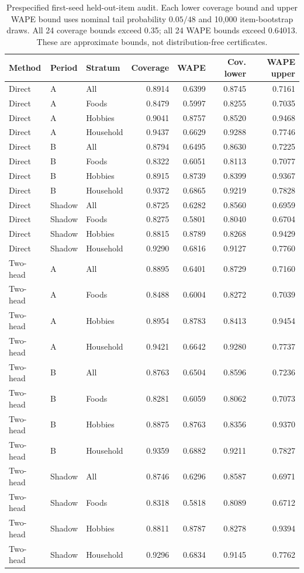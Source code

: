 \begin{table}[p]
\centering\small
\caption{Prespecified first-seed held-out-item audit. Each lower coverage bound and upper WAPE bound uses nominal tail probability $0.05/48$ and 10,000 item-bootstrap draws. All 24 coverage bounds exceed 0.35; all 24 WAPE bounds exceed 0.64013. These are approximate bounds, not distribution-free certificates.}
\label{tab:m5guardianbounds}
\begin{tabular}{lllrrrr}\toprule
Method & Period & Stratum & Coverage & WAPE & Cov. lower & WAPE upper\\\midrule
Direct & A & All & 0.8914 & 0.6399 & 0.8745 & 0.7161 \\
Direct & A & Foods & 0.8479 & 0.5997 & 0.8255 & 0.7035 \\
Direct & A & Hobbies & 0.9041 & 0.8757 & 0.8520 & 0.9468 \\
Direct & A & Household & 0.9437 & 0.6629 & 0.9288 & 0.7746 \\
Direct & B & All & 0.8794 & 0.6495 & 0.8630 & 0.7225 \\
Direct & B & Foods & 0.8322 & 0.6051 & 0.8113 & 0.7077 \\
Direct & B & Hobbies & 0.8915 & 0.8739 & 0.8399 & 0.9367 \\
Direct & B & Household & 0.9372 & 0.6865 & 0.9219 & 0.7828 \\
Direct & Shadow & All & 0.8725 & 0.6282 & 0.8560 & 0.6959 \\
Direct & Shadow & Foods & 0.8275 & 0.5801 & 0.8040 & 0.6704 \\
Direct & Shadow & Hobbies & 0.8815 & 0.8789 & 0.8268 & 0.9429 \\
Direct & Shadow & Household & 0.9290 & 0.6816 & 0.9127 & 0.7760 \\
Two-head & A & All & 0.8895 & 0.6401 & 0.8729 & 0.7160 \\
Two-head & A & Foods & 0.8488 & 0.6004 & 0.8272 & 0.7039 \\
Two-head & A & Hobbies & 0.8954 & 0.8783 & 0.8413 & 0.9454 \\
Two-head & A & Household & 0.9421 & 0.6642 & 0.9280 & 0.7737 \\
Two-head & B & All & 0.8763 & 0.6504 & 0.8596 & 0.7236 \\
Two-head & B & Foods & 0.8281 & 0.6059 & 0.8062 & 0.7073 \\
Two-head & B & Hobbies & 0.8875 & 0.8763 & 0.8356 & 0.9370 \\
Two-head & B & Household & 0.9359 & 0.6882 & 0.9211 & 0.7827 \\
Two-head & Shadow & All & 0.8746 & 0.6296 & 0.8587 & 0.6971 \\
Two-head & Shadow & Foods & 0.8318 & 0.5818 & 0.8089 & 0.6712 \\
Two-head & Shadow & Hobbies & 0.8811 & 0.8787 & 0.8278 & 0.9394 \\
Two-head & Shadow & Household & 0.9296 & 0.6834 & 0.9145 & 0.7762 \\
\bottomrule\end{tabular}
\end{table}
